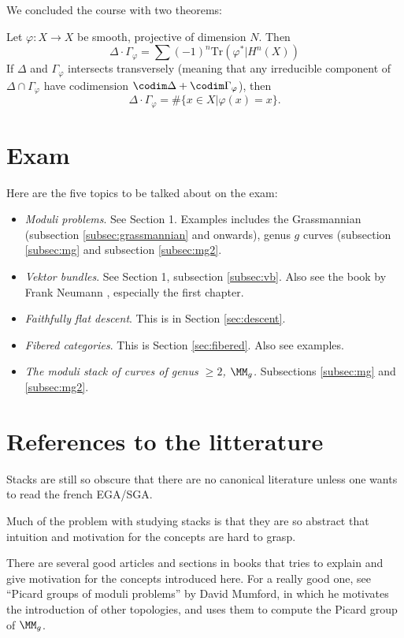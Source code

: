 \documentclass[11pt, english]{article}
\begin{document}
We concluded the course with two theorems:
\begin{thm}
Let $\varphi: X \to X$ be smooth, projective of dimension $N$. Then
\[
\Delta \cdot \Gamma_\varphi = \sum (-1)^n \mathrm{Tr}(\varphi^\ast |H^n(X))
\]
If $\Delta$ and $\Gamma_\varphi$ intersects transversely (meaning that any irreducible component of $\Delta \cap \Gamma_\varphi$ have codimension $\codim \Delta + \codim \Gamma_\varphi$), then
\[
\Delta \cdot \Gamma_\varphi = \# \{ x \in X | \varphi(x) = x \}.
\]
\end{thm}

\appendix

\pagebreak 
\section{Exam} 

Here are the five topics to be talked about on the exam:
\begin{itemize}
\item \emph{Moduli problems}. See Section 1. Examples includes the Grassmannian (subsection \ref{subsec:grassmannian} and onwards), genus $g$ curves (subsection \ref{subsec:mg} and subsection \ref{subsec:mg2}.
\item \emph{Vektor bundles}. See Section 1, subsection \ref{subsec:vb}. Also see the book by Frank Neumann \cite{neumann_stacks}, especially the first chapter.
\item \emph{Faithfully flat descent}. This is in Section \ref{sec:descent}. 
\item \emph{Fibered categories}. This is Section \ref{sec:fibered}. Also see examples.
\item \emph{The moduli stack of curves of genus $\geq 2$, $\MM_g$.} Subsections \ref{subsec:mg} and \ref{subsec:mg2}.
\end{itemize}

\section{References to the litterature}

Stacks are still so obscure that there are no canonical literature unless one wants to read the french EGA/SGA.

Much of the problem with studying stacks is that they are so abstract that intuition and motivation for the concepts are hard to grasp.

There are several good articles and sections in books that tries to explain and give motivation for the concepts introduced here. For a really good one, see ``Picard groups of moduli problems'' \cite{mumford_picard} by David Mumford, in which he motivates the introduction of other topologies, and uses them to compute the Picard group of $\MM_g$.
\end{document}
